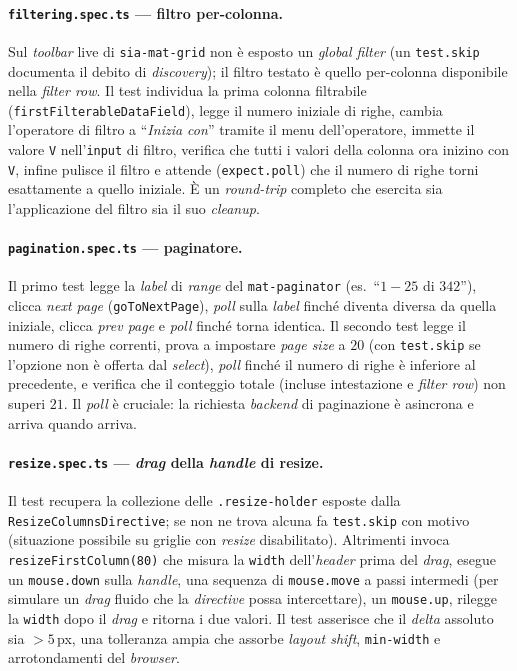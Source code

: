 \paragraph{\texttt{filtering.spec.ts} — filtro per-colonna.} Sul \emph{toolbar} live di \texttt{sia-mat-grid} non è esposto un \emph{global filter} (un \texttt{test.skip} documenta il debito di \emph{discovery}); il filtro testato è quello per-colonna disponibile nella \emph{filter row}. Il test individua la prima colonna filtrabile (\texttt{firstFilterableDataField}), legge il numero iniziale di righe, cambia l'operatore di filtro a ``\emph{Inizia con}'' tramite il menu dell'operatore, immette il valore \texttt{V} nell'\texttt{input} di filtro, verifica che tutti i valori della colonna ora inizino con \texttt{V}, infine pulisce il filtro e attende (\texttt{expect.poll}) che il numero di righe torni esattamente a quello iniziale. È un \emph{round-trip} completo che esercita sia l'applicazione del filtro sia il suo \emph{cleanup}.

\paragraph{\texttt{pagination.spec.ts} — paginatore.} Il primo test legge la \emph{label} di \emph{range} del \texttt{mat-paginator} (es.\ ``$1 - 25$ di $342$''), clicca \emph{next page} (\texttt{goToNextPage}), \emph{poll} sulla \emph{label} finché diventa diversa da quella iniziale, clicca \emph{prev page} e \emph{poll} finché torna identica. Il secondo test legge il numero di righe correnti, prova a impostare \emph{page size} a $20$ (con \texttt{test.skip} se l'opzione non è offerta dal \emph{select}), \emph{poll} finché il numero di righe è inferiore al precedente, e verifica che il conteggio totale (incluse intestazione e \emph{filter row}) non superi $21$. Il \emph{poll} è cruciale: la richiesta \emph{backend} di paginazione è asincrona e arriva quando arriva.

\paragraph{\texttt{resize.spec.ts} — \emph{drag} della \emph{handle} di resize.} Il test recupera la collezione delle \texttt{.resize-holder} esposte dalla \texttt{ResizeColumnsDirective}; se non ne trova alcuna fa \texttt{test.skip} con motivo (situazione possibile su griglie con \emph{resize} disabilitato). Altrimenti invoca \texttt{resizeFirstColumn(80)} che misura la \texttt{width} dell'\emph{header} prima del \emph{drag}, esegue un \texttt{mouse.down} sulla \emph{handle}, una sequenza di \texttt{mouse.move} a passi intermedi (per simulare un \emph{drag} fluido che la \emph{directive} possa intercettare), un \texttt{mouse.up}, rilegge la \texttt{width} dopo il \emph{drag} e ritorna i due valori. Il test asserisce che il \emph{delta} assoluto sia $> 5$\,px, una tolleranza ampia che assorbe \emph{layout shift}, \texttt{min-width} e arrotondamenti del \emph{browser}.

